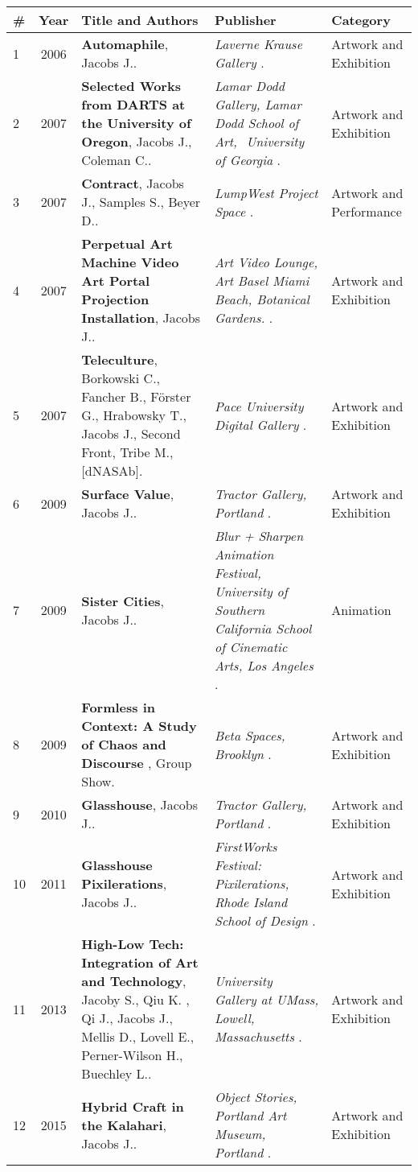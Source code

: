 
\begin{longtable}{lcp{7.75cm}>{\raggedright}p{5.25cm}p{1.75cm}}
\# & Year & Title and Authors & Publisher & Category\\
\hline 
\endhead 
    1 & 2006 & {\bf Automaphile}, Jacobs J.. & \emph{ Laverne Krause Gallery }.  & Artwork and Exhibition\\
    2 & 2007 & {\bf Selected Works from DARTS at the University of Oregon}, Jacobs J., Coleman C.. & \emph{ Lamar Dodd Gallery, Lamar Dodd School of Art,  University of Georgia }.  & Artwork and Exhibition\\
    3 & 2007 & {\bf Contract}, Jacobs J., Samples S., Beyer D.. & \emph{ LumpWest Project Space }.  & Artwork and Performance\\
    4 & 2007 & {\bf Perpetual Art Machine Video Art Portal Projection Installation}, Jacobs J.. & \emph{ Art Video Lounge, Art Basel Miami Beach, Botanical Gardens. }.  & Artwork and Exhibition\\
    5 & 2007 & {\bf Teleculture}, Borkowski C., Fancher B., Förster G., Hrabowsky T., Jacobs J., Second Front, Tribe M., [dNASAb]. & \emph{ Pace University Digital Gallery }.  & Artwork and Exhibition\\
    6 & 2009 & {\bf Surface Value}, Jacobs J.. & \emph{ Tractor Gallery, Portland }.  & Artwork and Exhibition\\
    7 & 2009 & {\bf Sister Cities}, Jacobs J.. & \emph{ Blur + Sharpen Animation Festival, University of Southern California School of Cinematic Arts, Los Angeles  }.  & Animation\\
    8 & 2009 & {\bf Formless in Context: A Study of Chaos and Discourse }, Group Show. & \emph{ Beta Spaces, Brooklyn }.  & Artwork and Exhibition\\
    9 & 2010 & {\bf Glasshouse}, Jacobs J.. & \emph{ Tractor Gallery, Portland }.  & Artwork and Exhibition\\
    10 & 2011 & {\bf Glasshouse Pixilerations}, Jacobs J.. & \emph{ FirstWorks Festival: Pixilerations, Rhode Island School of Design }.  & Artwork and Exhibition\\
    11 & 2013 & {\bf High-Low Tech: Integration of Art and Technology}, Jacoby S., Qiu K. , Qi J., Jacobs J., Mellis D., Lovell E., Perner-Wilson H., Buechley L.. & \emph{ University Gallery at UMass, Lowell, Massachusetts }.  & Artwork and Exhibition\\
    12 & 2015 & {\bf Hybrid Craft in the Kalahari}, Jacobs J.. & \emph{ Object Stories, Portland Art Museum, Portland }.  & Artwork and Exhibition\\

\end{longtable}
